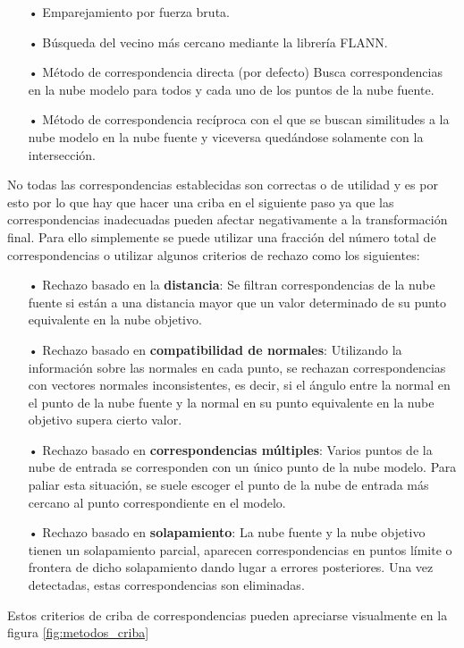 \begin{itemize}
\item[•]Emparejamiento por fuerza bruta.
\item[•]Búsqueda del vecino más cercano mediante la librería FLANN.
\item[•]Método de correspondencia directa (por defecto) Busca correspondencias en la nube modelo para todos y cada uno de los puntos de la nube fuente.
\item[•]Método de correspondencia recíproca con el que se buscan similitudes a la nube modelo en la nube fuente y viceversa quedándose solamente con la intersección.
\end{itemize}

No todas las correspondencias establecidas son correctas o de utilidad y es por esto por lo que hay que hacer una criba en el siguiente paso ya que las correspondencias inadecuadas pueden afectar negativamente a la transformación final. Para ello simplemente se puede utilizar una fracción del número total de correspondencias o utilizar algunos criterios de rechazo como los siguientes:

\begin{itemize}
\item[•]Rechazo basado en la \textbf{distancia}:
Se filtran correspondencias de la nube fuente si están a una distancia mayor que un valor determinado de su punto equivalente en la nube objetivo.
\item[•]Rechazo basado en \textbf{compatibilidad de normales}:
Utilizando la información sobre las normales en cada punto, se rechazan correspondencias con vectores normales inconsistentes, es decir, si el ángulo entre la normal en el punto de la nube fuente y la normal en su punto equivalente en la nube objetivo supera cierto valor.
\item[•]Rechazo basado en \textbf{correspondencias múltiples}: 
Varios puntos de la nube de entrada se corresponden con un único punto de la nube modelo. Para paliar esta situación, se suele escoger el punto de la nube de entrada más cercano al punto correspondiente en el modelo.
\item[•]Rechazo basado en \textbf{solapamiento}:
La nube fuente y la nube objetivo tienen un solapamiento parcial, aparecen correspondencias en puntos límite o frontera de dicho solapamiento dando lugar a errores posteriores. Una vez detectadas, estas correspondencias son eliminadas. 
\end{itemize}

Estos criterios de criba de correspondencias pueden apreciarse visualmente en la figura \ref{fig:metodos_criba}

